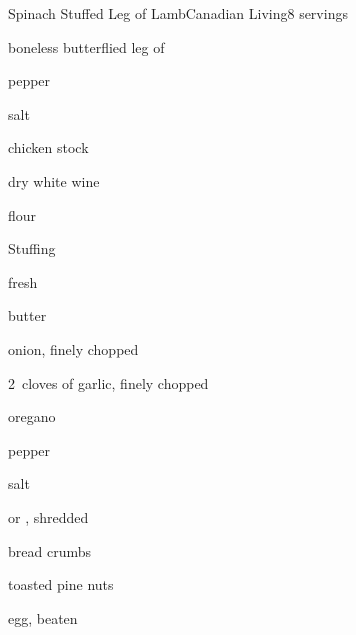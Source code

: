 \begin{recipe}{Spinach Stuffed Leg of Lamb}{Canadian Living}{8 servings}

\begin{ingredients}
\item {} boneless butterflied leg of 
\item \tp{\half} pepper
\item \tp{\quarter} salt
\item {} chicken stock
\item \C{\quarter} dry white wine
\item {} flour
\end{ingredients}

Stuffing
\begin{ingredients}
\item {} fresh 
\item {} butter
\item onion, finely chopped
\item 2~cloves of garlic, finely chopped
\item {} oregano
\item \tp{\half} pepper
\item \tp{\quarter} salt
\item \C{\half}  or , shredded
\item \C{\half} bread crumbs
\item \C{\third} toasted pine nuts
\item egg, beaten
\end{ingredients}


\end{recipe}

